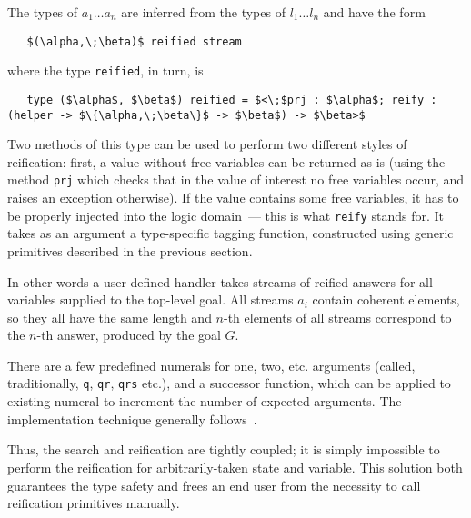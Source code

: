 The types of \mbox{$a_1\dots a_n$} are inferred from the types of \mbox{$l_1\dots l_n$} and
have the form

\begin{lstlisting}
   $(\alpha,\;\beta)$ reified stream
\end{lstlisting}

\noindent where the type \lstinline{reified}, in turn, is

\begin{lstlisting}
   type ($\alpha$, $\beta$) reified = $<\;$prj : $\alpha$; reify : (helper -> $\{\alpha,\;\beta\}$ -> $\beta$) -> $\beta>$
\end{lstlisting}

Two methods of this type can be used to perform two different styles of reification: first, a value without
free variables can be returned as is (using the method \lstinline{prj} which checks that in the value of
interest no free variables occur, and raises an exception otherwise). If the value contains some free
variables, it has to be properly injected into the logic domain~--- this is what \lstinline{reify} stands
for. It takes as an argument a type-specific tagging function, constructed using generic
primitives described in the previous section.

In other words a user-defined handler takes streams of reified answers for all variables supplied to the top-level
goal. All streams $a_i$ contain coherent elements, so they all have the same length and $n$-th elements of all
streams correspond to the $n$-th answer, produced by the goal $G$.

There are a few predefined numerals for one, two, etc. arguments (called, traditionally,
\lstinline{q}, \lstinline{qr}, \lstinline{qrs} etc.), and a successor function, which
can be applied to existing numeral to increment the number of expected arguments. The
implementation technique generally follows~\cite{Unparsing, DoWeNeed}.

Thus, the search and reification are tightly coupled; it is simply impossible to perform the reification 
for arbitrarily-taken state and variable. This solution both guarantees the type safety and frees an end
user from the necessity to call reification primitives manually.
